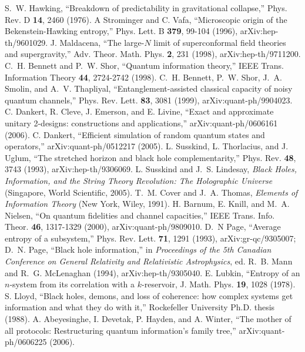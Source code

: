 \documentclass[12pt]{article}
\begin{document}
\begin{thebibliography}{99}
 S.~W. Hawking, ``Breakdown of predictability in gravitational collapse,'' Phys. Rev. D {\bf 14}, 2460 (1976).
 A Strominger and C. Vafa, ``Microscopic origin of the Bekenstein-Hawking entropy,'' Phys. Lett. B {\bf 379}, 99-104 (1996), arXiv:hep-th/9601029.
 J. Maldacena, ``The large-$N$ limit of superconformal field theories and supergravity,'' Adv. Theor. Math. Phys. {\bf 2}, 231 (1998), arXiv:hep-th/9711200.
 C.~H. Bennett and P.~W. Shor, ``Quantum information theory,'' IEEE Trans. Information Theory {\bf 44}, 2724-2742 (1998).
 C.~H. Bennett, P.~W. Shor, J.~A. Smolin, and A.~V. Thapliyal, ``Entanglement-assisted classical capacity of noisy quantum channels,'' Phys. Rev. Lett. {\bf 83}, 3081 (1999), arXiv:quant-ph/9904023.
 C. Dankert, R. Cleve, J. Emerson, and E. Livine, ``Exact and approximate unitary 2-designs: constructions and applications,'' arXiv:quant-ph/0606161 (2006).
 C. Dankert, ``Efficient simulation of random quantum states and operators,''  arXiv:quant-ph/0512217 (2005).
 L. Susskind, L. Thorlacius, and J. Uglum, ``The stretched horizon and black hole complementarity,'' Phys. Rev. {\bf 48}, 3743 (1993), arXiv:hep-th/9306069.
 L. Susskind and J.~S. Lindesay, {\em Black Holes, Information, and the String Theory Revolution: The Holographic Universe} (Singapore, World Scientific, 2005).
 T.~M. Cover and J.~A. Thomas, {\em Elements of Information Theory} (New York, Wiley, 1991).
 H. Barnum, E. Knill, and M.~A. Nielsen, ``On quantum fidelities and channel capacities,'' IEEE Trans. Info. Theor. {\bf 46}, 1317-1329 (2000), arXiv:quant-ph/9809010.
 D.~N Page, ``Average entropy of a subsystem,'' Phys. Rev. Lett. {\bf 71}, 1291 (1993), arXiv:gr-qc/9305007; D.~N. Page, ``Black hole information,'' in {\em Proceedings of the 5th Canadian Conference on General Relativity and Relativistic Astrophysics}, ed. R.~B. Mann and R.~G. McLenaghan (1994), arXiv:hep-th/9305040.
 E. Lubkin, ``Entropy of an $n$-system from its correlation with a $k$-reservoir, J. Math. Phys. {\bf 19}, 1028 (1978).
 S. Lloyd, ``Black holes, demons, and loss of coherence: how complex systems get information and what they do with it,'' Rockefeller University Ph.D. thesis (1988).
 A. Abeyesinghe, I. Devetak, P. Hayden, and A. Winter, ``The mother of all protocols: Restructuring quantum information's family tree,'' arXiv:quant-ph/0606225 (2006).

\end{thebibliography}
\end{document}
